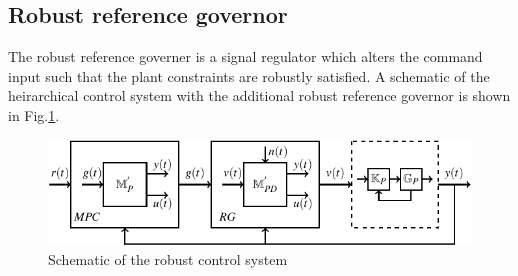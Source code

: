 \documentclass[letterpaper, 10 pt, conference]{ieeeconf}  %
\begin{document}
	\subsection{Robust reference governor}
	The robust reference governer is a signal regulator which alters the command input such that the plant constraints are robustly satisfied. A schematic of the heirarchical control system with the additional robust reference governor is shown in Fig.\ref{fullloop}. 
	\begin{figure}[h]
		\vspace{-3pt}
		\hspace{10pt}
		\includegraphics[scale = 0.8]{withRG.pdf}
		\caption{Schematic of the robust control system}
		\label{fullloop}
	\end{figure} 
	
\end{document}
